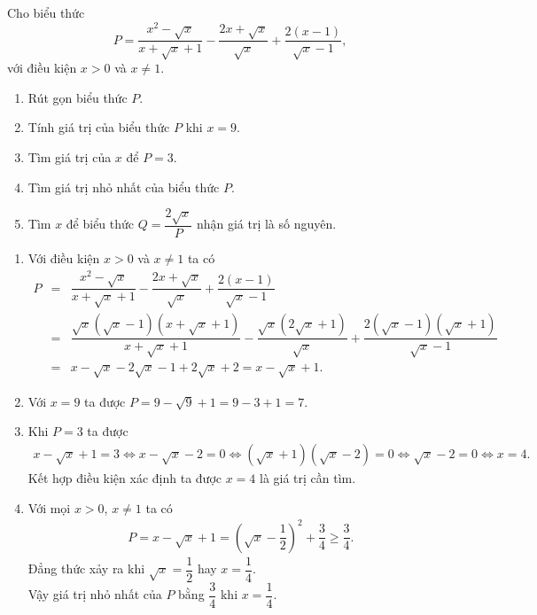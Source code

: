 \begin{bt}%
	Cho biểu thức $$P=\dfrac{x^2-\sqrt{x}}{x+\sqrt{x}+1} - \dfrac{2x+\sqrt{x}}{\sqrt{x}} + \dfrac{2(x-1)}{\sqrt{x}-1},$$ với điều kiện $x>0$ và $x\neq 1$.
	\begin{enumerate}
		\item Rút gọn biểu thức $P$.
		\item Tính giá trị của biểu thức $P$ khi $x=9$.
		\item Tìm giá trị của $x$ để $P=3$.
		\item Tìm giá trị nhỏ nhất của biểu thức $P$.
		\item Tìm $x$ để biểu thức $Q=\dfrac{2\sqrt{x}}{P}$ nhận giá trị là số nguyên.
	\end{enumerate}
	\loigiai
	{
		\begin{enumerate}
			\item Với điều kiện $x>0$ và $x\neq 1$ ta có
			\allowdisplaybreaks
			\begin{eqnarray*}
				P &=& \dfrac{x^2-\sqrt{x}}{x+\sqrt{x}+1} - \dfrac{2x+\sqrt{x}}{\sqrt{x}} + \dfrac{2(x-1)}{\sqrt{x}-1}\\
				&=& \dfrac{\sqrt{x}\left(\sqrt{x}-1\right)\left(x+\sqrt{x}+1\right)}{x+\sqrt{x}+1} - \dfrac{\sqrt{x}\left(2\sqrt{x}+1\right)}{\sqrt{x}} + \dfrac{2\left(\sqrt{x}-1\right)\left(\sqrt{x}+1\right)}{\sqrt{x}-1}\\
				&=& x-\sqrt{x} - 2\sqrt{x}-1 + 2\sqrt{x}+2 = x-\sqrt{x}+1.
			\end{eqnarray*}
			\item Với $x=9$ ta được $P = 9 - \sqrt{9}+1 = 9 - 3 + 1 = 7$.
			\item Khi $P=3$ ta được
			\allowdisplaybreaks
			\begin{eqnarray*}
				x-\sqrt{x}+1 = 3 \Leftrightarrow x-\sqrt{x}-2=0 \Leftrightarrow\left(\sqrt{x}+1\right)\left(\sqrt{x}-2\right)=0 \Leftrightarrow \sqrt{x}-2=0 \Leftrightarrow x=4.
			\end{eqnarray*}
			Kết hợp điều kiện xác định ta được $x=4$ là giá trị cần tìm.
			\item Với mọi $x>0$, $x \neq 1$ ta có
			\begin{eqnarray*}
				P = x-\sqrt{x}+1 = \left(\sqrt{x}-\dfrac{1}{2}\right)^2 + \dfrac{3}{4} \geq \dfrac{3}{4}.
			\end{eqnarray*}
			Đẳng thức xảy ra khi $\sqrt{x}=\dfrac{1}{2}$ hay $x=\dfrac{1}{4}$.\\
			Vậy giá trị nhỏ nhất của $P$ bằng $\dfrac{3}{4}$ khi $x=\dfrac{1}{4}$.

\end{enumerate}}
\end{bt}
